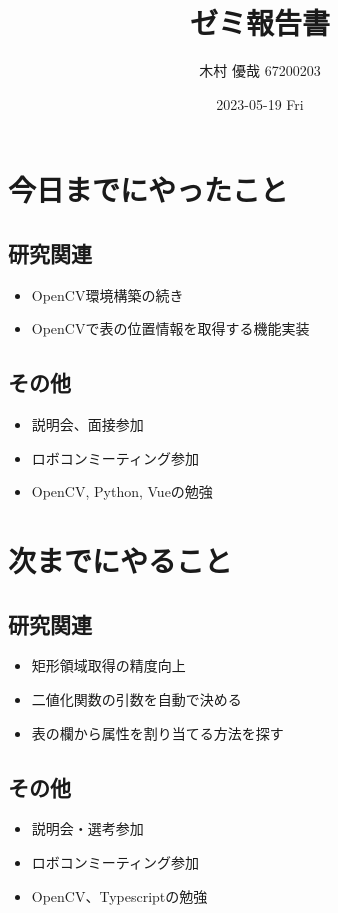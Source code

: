 \documentclass[uplatex, onecolumn, 10pt]{jsarticle}
\begin{document}
\title{\vspace{-40mm}\bf{\LARGE{ゼミ報告書}}}
\author{\vspace{-40mm}木村 優哉 67200203}
\date{2023-05-19 Fri}
\maketitle


\section{今日までにやったこと}

\subsection*{研究関連}
\begin{itemize}
	\item OpenCV環境構築の続き
	\item OpenCVで表の位置情報を取得する機能実装
\end{itemize}

\subsection*{その他}
\begin{itemize}
	\item 説明会、面接参加
	\item ロボコンミーティング参加
	\item OpenCV, Python, Vueの勉強
\end{itemize}


\section{次までにやること}

\subsection*{研究関連}
\begin{itemize}
	\item 矩形領域取得の精度向上
	\item 二値化関数の引数を自動で決める
	\item 表の欄から属性を割り当てる方法を探す
\end{itemize}

\subsection*{その他}
\begin{itemize}
	\item 説明会・選考参加
	\item ロボコンミーティング参加
	\item OpenCV、Typescriptの勉強
\end{itemize}
\end{document}
